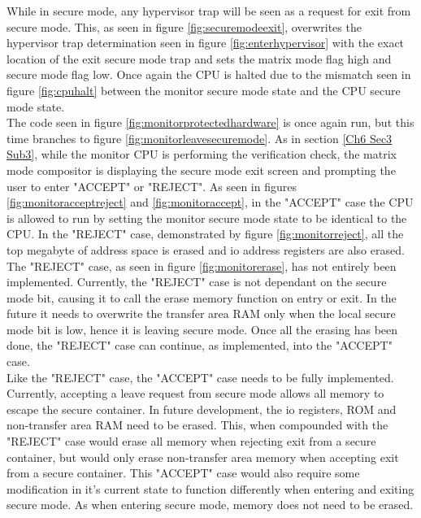 \label{Ch6 Sec3 Sub4}

While in secure mode, any hypervisor trap will be seen as a request for exit from secure mode. This, as seen in figure \ref{fig:securemodeexit}, overwrites the hypervisor trap determination seen in figure \ref{fig:enterhypervisor} with the exact location of the exit secure mode trap and sets the matrix mode flag high and secure mode flag low. Once again the CPU is halted due to the mismatch seen in figure \ref{fig:cpuhalt} between the monitor secure mode state and the CPU secure mode state.\\

The code seen in figure \ref{fig:monitorprotectedhardware} is once again run, but this time branches to figure \ref{fig:monitorleavesecuremode}. As in section \ref{Ch6 Sec3 Sub3}, while the monitor CPU is performing the verification check, the matrix mode compositor is displaying the secure mode exit screen and prompting the user to enter "ACCEPT" or "REJECT". As seen in figures \ref{fig:monitoracceptreject} and \ref{fig:monitoraccept}, in the "ACCEPT" case the CPU is allowed to run by setting the monitor secure mode state to be identical to the CPU. In the "REJECT" case, demonstrated by figure \ref{fig:monitorreject},  all the top megabyte of address space is erased and io address registers are also erased.\\

The "REJECT" case, as seen in figure \ref{fig:monitorerase}, has not entirely been implemented. Currently, the "REJECT" case is not dependant on the secure mode bit, causing it to call the erase memory function on entry or exit. In the future it needs to overwrite the transfer area RAM only when the local secure mode bit is low, hence it is leaving secure mode. Once all the erasing has been done, the "REJECT" case can continue, as implemented, into the "ACCEPT" case.\\

Like the "REJECT" case, the "ACCEPT" case needs to be fully implemented. Currently, accepting a leave request from secure mode allows all memory to escape the secure container. In future development, the io registers, ROM and non-transfer area RAM need to be erased. This, when compounded with the "REJECT" case would erase all memory when rejecting exit from a secure container, but would only erase non-transfer area memory when accepting exit from a secure container. This "ACCEPT" case would also require some modification in it's current state to function differently when entering and exiting secure mode. As when entering secure mode, memory does not need to be erased. 

